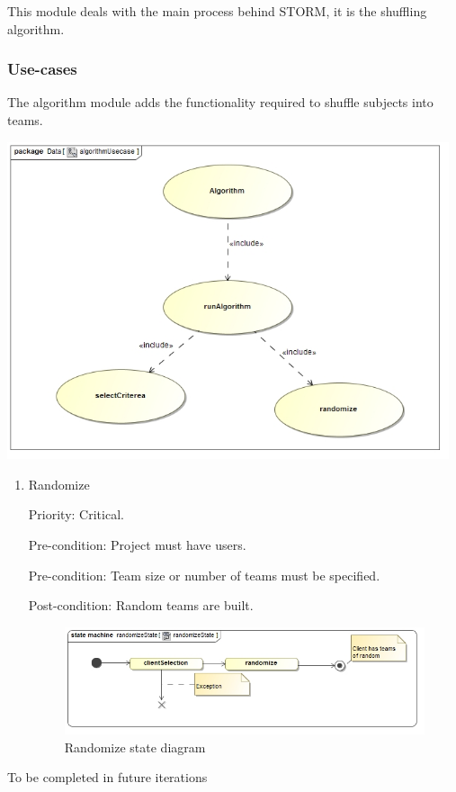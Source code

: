 This module deals with the main process behind STORM, it is the shuffling algorithm.

\subsubsection{Use-cases}
The algorithm module adds the functionality required to shuffle subjects into teams.\par
\includegraphics[width=13cm]{./graphics/algorithmUsecase.jpg}
    \rule{0\linewidth}{0.15\linewidth}\par

\begin{enumerate}
\item Randomize\par
Priority: Critical.\par
Pre-condition: Project must have users.\par
Pre-condition: Team size or number of teams must be specified.\par
Post-condition: Random teams are built.\par
    \begin{figure}[h]
        \centering
        \includegraphics[width=13cm]{./graphics/randomizeState.jpg}
        \caption{Randomize state diagram}
        \label{fig:randomize_state}
    \end{figure}
\end{enumerate}
To be completed in future iterations
\pagebreak